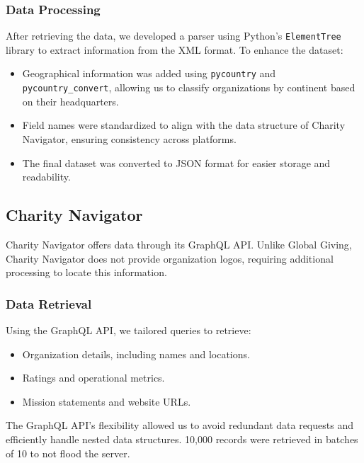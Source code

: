 \documentclass[unicode,9pt,a4paper,oneside,numbers=endperiod,openany]{scrartcl}
\begin{document}
\subsubsection{Data Processing}
After retrieving the data, we developed a parser using Python's \texttt{ElementTree} library to extract information from the XML format. To enhance the dataset:
\begin{itemize}
\item Geographical information was added using \texttt{pycountry} and \texttt{pycountry\_convert}, allowing us to classify organizations by continent based on their headquarters.
\item Field names were standardized to align with the data structure of Charity Navigator, ensuring consistency across platforms.
\item The final dataset was converted to JSON format for easier storage and readability.
\end{itemize}

\subsection{Charity Navigator}
Charity Navigator offers data through its GraphQL API. Unlike Global Giving, Charity Navigator does not provide organization logos, requiring additional processing to locate this information.

\subsubsection{Data Retrieval}
Using the GraphQL API, we tailored queries to retrieve:
\begin{itemize}
\item Organization details, including names and locations.
\item Ratings and operational metrics.
\item Mission statements and website URLs.
\end{itemize}
The GraphQL API's flexibility allowed us to avoid redundant data requests and efficiently handle nested data structures. 10,000 records were retrieved in batches of 10 to not flood the server.
\end{document}
